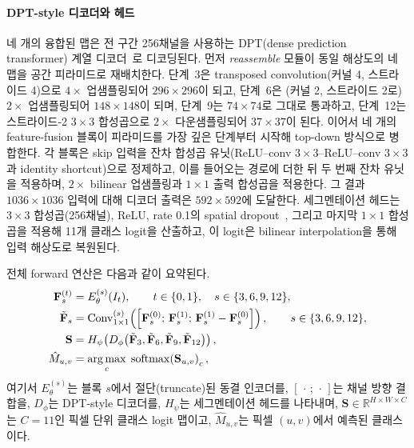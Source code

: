 \paragraph{DPT-style 디코더와 헤드}
네 개의 융합된 맵은 전 구간 256채널을 사용하는 DPT(dense prediction
transformer) 계열 디코더~\cite{Ranftl2021DPT}로 디코딩된다. 먼저
\emph{reassemble} 모듈이 동일 해상도의 네 맵을 공간 피라미드로
재배치한다. 단계~3은 transposed convolution(커널 4, 스트라이드 4)으로
$4\times$ 업샘플링되어 $296 \times 296$이 되고, 단계~6은 (커널 2,
스트라이드 2로) $2\times$ 업샘플링되어 $148 \times 148$이 되며,
단계~9는 $74 \times 74$로 그대로 통과하고, 단계~12는 스트라이드-2
$3 \times 3$ 합성곱으로 $2\times$ 다운샘플링되어 $37 \times 37$이
된다. 이어서 네 개의 feature-fusion 블록이 피라미드를 가장 깊은
단계부터 시작해 top-down 방식으로 병합한다. 각 블록은 skip 입력을
잔차 합성곱 유닛(ReLU--conv $3{\times}3$--ReLU--conv $3{\times}3$과
identity shortcut)으로 정제하고, 이를 들어오는 경로에 더한 뒤 두 번째
잔차 유닛을 적용하며, $2\times$ bilinear 업샘플링과 $1 \times 1$ 출력
합성곱을 적용한다. 그 결과 $1036 \times 1036$ 입력에 대해 디코더
출력은 $592 \times 592$에 도달한다. 세그멘테이션 헤드는 $3 \times 3$
합성곱(256채널), ReLU, rate 0.1의 spatial dropout~\cite{Srivastava2014Dropout}, 그리고 마지막 $1 \times 1$ 합성곱을
적용해 11개 클래스 logit을 산출하고, 이 logit은 bilinear
interpolation을 통해 입력 해상도로 복원된다.

전체 forward 연산은 다음과 같이 요약된다.
\begin{equation}
\begin{aligned}
\mathbf{F}^{(t)}_s &= E^{(s)}_{\theta}(I_t),
  \qquad t \in \{0, 1\}, \quad s \in \{3, 6, 9, 12\}, \\
\tilde{\mathbf{F}}_s &= \mathrm{Conv}_{1 \times 1}^{(s)}\!\left(
  \left[\mathbf{F}^{(0)}_s;\, \mathbf{F}^{(1)}_s;\,
        \mathbf{F}^{(1)}_s - \mathbf{F}^{(0)}_s\right]\right),
  \qquad s \in \{3, 6, 9, 12\}, \\
\mathbf{S} &= H_{\psi}\!\left(D_{\phi}\!\left(
  \tilde{\mathbf{F}}_3, \tilde{\mathbf{F}}_6,
  \tilde{\mathbf{F}}_9, \tilde{\mathbf{F}}_{12}\right)\right), \\
\hat{M}_{u,v} &= \operatorname*{arg\,max}_{c}\; \mathrm{softmax}\!\left(
  \mathbf{S}_{u,v}\right)_c ,
\end{aligned}
\label{eq:forward}
\end{equation}
여기서 $E^{(s)}_{\theta}$는 블록 $s$에서 절단(truncate)된 동결
인코더를, $[\,\cdot\,;\,\cdot\,]$는 채널 방향 결합을, $D_{\phi}$는
DPT-style 디코더를, $H_{\psi}$는 세그멘테이션 헤드를 나타내며,
$\mathbf{S} \in \mathbb{R}^{H \times W \times C}$는 $C = 11$인 픽셀
단위 클래스 logit 맵이고, $\hat{M}_{u,v}$는 픽셀 $(u, v)$에서 예측된
클래스이다.

